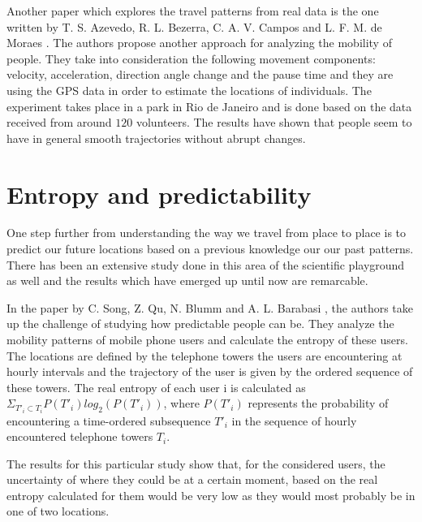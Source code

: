 Another paper which explores the travel patterns from real data is the one
written by T. S. Azevedo, R. L. Bezerra, C. A. V. Campos and L. F. M. de Moraes
\cite{Azevedo09}. The authors propose another approach for analyzing the mobility
of people. They take into consideration the following movement components:
velocity, acceleration, direction angle change and the pause time and they are
using the GPS data in order to estimate the locations of individuals. The
experiment takes place in a park in Rio de Janeiro and is done based on the data
received from around $120$ volunteers. The results have shown that people seem
to have in general smooth trajectories without abrupt changes.

\section{Entropy and predictability}
One step further from understanding the way we travel from place to place is to
predict our future locations based on a previous knowledge our our past
patterns. There has been an extensive study done in this area of the scientific
playground as well and the results which have emerged up until now are
remarcable.

In the paper by C. Song, Z. Qu, N. Blumm and A. L. Barabasi \cite{Barabasi10},
the authors take up the challenge of studying how predictable people can be.
They analyze the mobility patterns of mobile phone users and calculate the
entropy of these users. The locations are defined by the telephone towers the
users are encountering at hourly intervals and the trajectory of the user is
given by the ordered sequence of these towers. The real entropy of each user i
is calculated as $\Sigma _{T'_{i}\subset T_{i}} P(T'_{i})log_{2}(P(T'_{i}))$,
where $P(T'_{i})$ represents the probability of encountering a time-ordered
subsequence $T'_{i}$ in the sequence of hourly encountered telephone towers
$T_{i}$.

The results for this particular study show that, for the considered users, the
uncertainty of where they could be at a certain moment, based on the real
entropy calculated for them would be very low as they would most probably be in
one of two locations.

